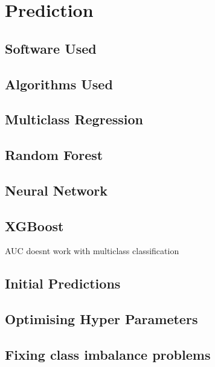 \chapter{Prediction}

\section{Software Used}

\section{Algorithms Used}
\section{Multiclass Regression}
\section{Random Forest}
\section{Neural Network}
\section{XGBoost}
AUC doesnt work with multiclass classification

\section{Initial Predictions}

\section{Optimising Hyper Parameters}

\section{Fixing class imbalance problems}
